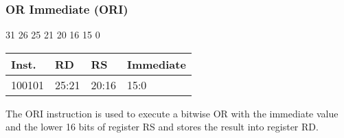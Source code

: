 \documentclass[12pt]{article}
\begin{document}

    \newpage
    \subsubsection{OR Immediate (ORI)}
    
    \hspace{1.6cm}31 \hspace{1.15cm}26 \hspace{.05cm}25 \hspace{.8cm}21 \hspace{.05cm}20 \hspace{.8cm}16 \hspace{.05cm}15 \hspace{6.4cm}0
    \vspace{-.25cm}
    \begin{center}
        \begin{tabular}{ |p{1.8cm}|p{1.5cm}|p{1.5cm}|p{6.8cm}| }
            \hline
            \textbf{Inst.} & \textbf{RD} &  \textbf{RS} & \textbf{Immediate}\\
            \hline
            100101& 25:21 & 20:16 &15:0\\
            \hline
        \end{tabular}
    \end{center}
    
    \noindent
    The ORI instruction is used to execute a bitwise OR with the immediate value and the lower 16 bits of register RS and stores the result into register RD. 
    
\end{document}
